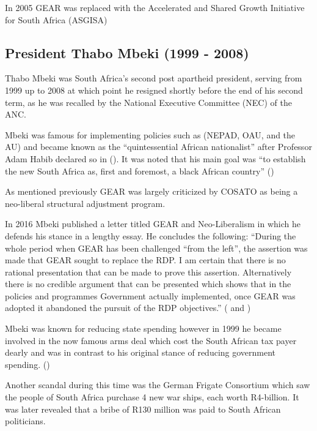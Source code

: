 \documentclass{elsarticle}
\begin{document}
In 2005 GEAR was replaced with the Accelerated and Shared Growth Initiative for South Africa (ASGISA)

\subsection{President Thabo Mbeki (1999 - 2008)}
Thabo Mbeki was South Africa's second post apartheid president, serving from 1999 up to 2008 at which point he resigned shortly before the end of his second term, as he was recalled by the National Executive Committee (NEC) of the ANC.

Mbeki was famous for implementing policies such as (NEPAD, OAU, and the AU) and became known as the “quintessential African nationalist” after Professor Adam Habib declared so in (\cite{Economist2006}). It was noted that his main goal was “to establish the new South Africa as, first and foremost, a black African country” (\cite{Economist2006})

As mentioned previously GEAR was largely criticized by COSATO as being a neo-liberal structural adjustment program. 

In 2016 Mbeki published a letter titled GEAR and Neo-Liberalism in which he defends his stance in a lengthy essay. He concludes the following: “During the whole period when GEAR has been challenged “from the left”, the assertion was made that GEAR sought to replace the RDP. I am certain that there is no rational presentation that can be made to prove this assertion. Alternatively there is no credible argument that can be presented which shows that in the policies and programmes Government actually implemented, once GEAR was adopted it abandoned the pursuit of the RDP objectives.” (\cite{Mbeki2016a} and \cite{Mbeki2016b})

Mbeki was known for reducing state spending however in 1999 he became involved in the now famous arms deal which cost the South African tax payer dearly and was in contrast to his original stance of reducing government spending. (\cite{SAHO2017})

Another scandal during this time was the German Frigate Consortium which saw the people of South Africa purchase 4 new war ships, each worth R4-billion. It was later revealed that a bribe of R130 million was paid to South African politicians. 

\end{document}
